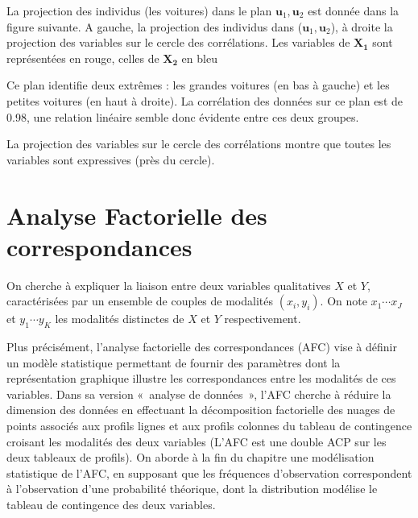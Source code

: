 \documentclass[letterpaper,10pt,french]{sphinxmanual}
\begin{document}
\sphinxAtStartPar
La projection des individus (les voitures) dans le plan \(\mathbf u_1,\mathbf u_2\) est donnée dans la figure suivante. A gauche, la projection des individus dans (\(\mathbf u_1,\mathbf u_2\)), à droite la projection des variables sur le cercle des corrélations. Les  variables de  \(\mathbf{X_1}\) sont représentées en rouge, celles de  \(\mathbf{X_2}\)  en bleu

\sphinxAtStartPar
{}

\sphinxAtStartPar
Ce plan identifie  deux extrêmes : les grandes voitures (en bas à gauche) et les petites  voitures (en haut à droite). La corrélation des données sur ce plan est de 0.98, une relation linéaire semble donc évidente entre ces deux groupes.

\sphinxAtStartPar
La projection des variables sur le cercle des corrélations montre  que toutes les variables sont expressives (près du cercle).

\sphinxstepscope


\chapter{Analyse Factorielle des correspondances}
\label{\detokenize{afc:analyse-factorielle-des-correspondances}}\label{\detokenize{afc::doc}}
\ignorespaces 
\sphinxAtStartPar
On cherche à expliquer la liaison entre deux variables qualitatives \(X\) et \(Y\), caractérisées par un ensemble de couples de modalités \((x_i,y_i)\). On note \(x_1\cdots x_J\) et \(y_1\cdots y_K\) les modalités distinctes de \(X\) et \(Y\) respectivement.

\sphinxAtStartPar
Plus précisément, l’analyse factorielle des correspondances (AFC) vise à définir un modèle statistique permettant de fournir des paramètres dont la représentation graphique illustre les correspondances entre les modalités de ces variables. Dans sa version « analyse de données », l’AFC cherche à réduire la dimension des données en effectuant la décomposition factorielle des nuages de points associés aux profils lignes et aux profils colonnes du tableau de contingence croisant les modalités des deux variables (L’AFC est une double ACP sur les deux tableaux de profils). On aborde à la fin du chapitre une modélisation statistique de l’AFC, en supposant que les fréquences d’observation correspondent à l’observation d’une probabilité théorique, dont la distribution modélise le tableau de contingence des deux variables.
\end{document}
